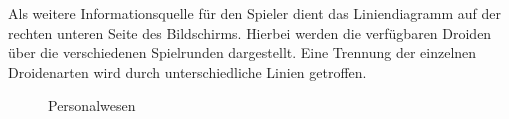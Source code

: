 Als weitere Informationsquelle für den Spieler dient das Liniendiagramm auf der rechten unteren Seite des Bildschirms. Hierbei werden die verfügbaren Droiden über die verschiedenen Spielrunden dargestellt. Eine Trennung der einzelnen Droidenarten wird durch unterschiedliche Linien getroffen. 

\begin{figure}[htbp]
  \centering
  \caption{Personalwesen}
  \label{img:ui-personalwesen}
\end{figure}

\autorende{}